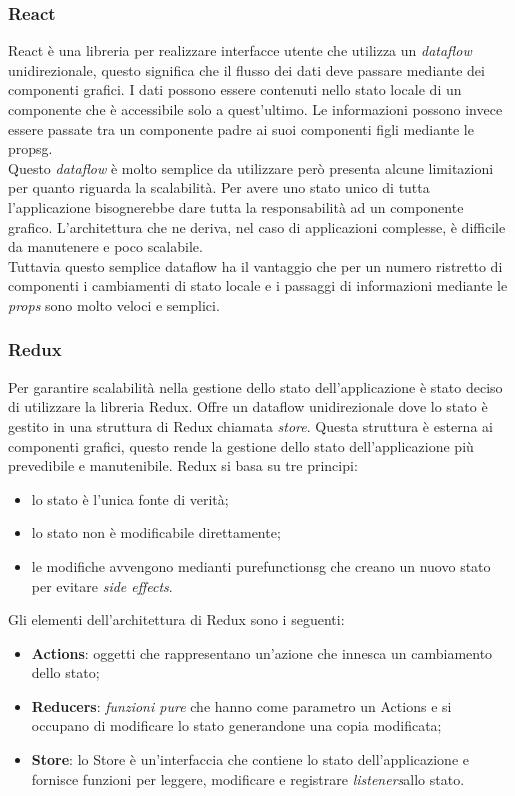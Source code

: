 \subsubsection*{React}
React è una libreria per realizzare interfacce utente che utilizza un \emph{dataflow} unidirezionale, questo significa che il flusso dei dati deve passare mediante dei componenti grafici. I dati possono essere contenuti nello stato locale di un componente che è accessibile solo a quest'ultimo. Le informazioni possono invece essere passate tra un componente padre ai suoi componenti figli mediante le \gls{propsg}. \\
Questo \emph{dataflow} è molto semplice da utilizzare però presenta alcune limitazioni per quanto riguarda la scalabilità. Per avere uno stato unico di tutta l'applicazione bisognerebbe dare tutta la responsabilità ad un componente grafico. L'architettura che ne deriva, nel caso di applicazioni complesse, è difficile da manutenere e poco scalabile. \\
Tuttavia questo semplice dataflow ha il vantaggio che per un numero ristretto di componenti i cambiamenti di stato locale e i passaggi di informazioni mediante le \emph{props} sono molto veloci e semplici.

\subsubsection*{Redux}
Per garantire scalabilità nella gestione dello stato dell'applicazione è stato deciso di utilizzare la libreria Redux. Offre un dataflow unidirezionale dove lo stato è gestito in una struttura di Redux chiamata \emph{store}. Questa struttura è esterna ai componenti grafici, questo rende la gestione dello stato dell'applicazione più prevedibile e manutenibile. Redux si basa su tre principi:
\begin{itemize}
	\item lo stato è l'unica fonte di verità;
	\item lo stato non è modificabile direttamente;
	\item le modifiche avvengono medianti \gls{purefunctionsg} che creano un nuovo stato per evitare \emph{side effects}.
\end{itemize}

\noindent
Gli elementi dell'architettura di Redux sono i seguenti:
\begin{itemize}
	\item \textbf{Actions}: oggetti che rappresentano un'azione che innesca un cambiamento dello stato;
	\item \textbf{Reducers}: \emph{funzioni pure} che hanno come parametro un Actions e si occupano di modificare lo stato generandone una copia modificata;
	\item \textbf{Store}: lo Store è un'interfaccia che contiene lo stato dell'applicazione e fornisce funzioni per leggere, modificare e registrare \emph{listeners}\glosp allo stato.
\end{itemize}

